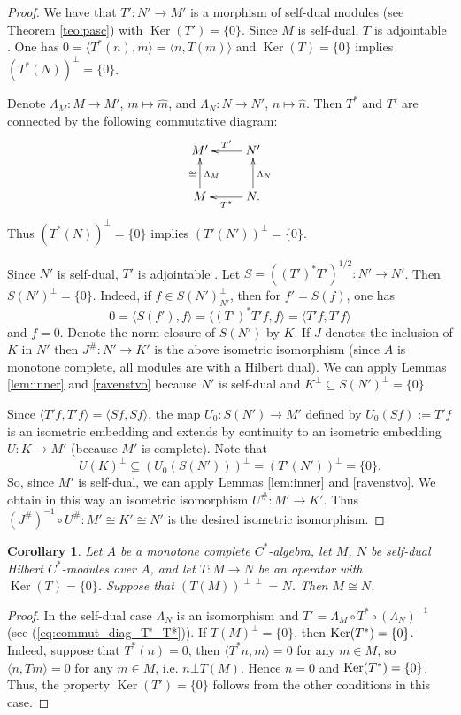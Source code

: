 \documentclass[12pt]{amsart}
\newtheorem{cor}[teo]{Corollary}
\newcommand{\Ker}{\operatorname{Ker}}
\def\<{\langle}
\def\>{\rangle}
\def\Ker{\mathop{\rm Ker}\nolimits}
\begin{document}
\begin{proof}
We have that $T':N'\to M'$ is  a morphism of self-dual modules (see Theorem \ref{teo:pasc})
with $\operatorname{Ker}(T')=\{0\}$. 
Since $M$ is self-dual, $T$ is adjointable \cite{Pas1}. 
One has $0=\<T^*(n),m\>=\<n, T(m)\>$ and 
$\operatorname{Ker}(T)=\{0\}$ implies $(T^*(N))^\bot =\{0\}$.

Denote $\Lambda_M: M \to M'$, $m \mapsto \widehat{m}$, and $\Lambda_N: N \to N'$, $n\mapsto \widehat{n}$. Then $T^*$ and $T'$ are connected by the following
commutative diagram:
\begin{equation}\label{eq:commut_diag_T'_T*}
\xymatrix{
M' & \ar[l]_{T'} N'\\
M \ar[u]^\cong_{\Lambda_M}& \ar[l]^{T^*} N \ar[u]_{\Lambda_N}.
}
\end{equation}
Thus $(T^*(N))^\bot =\{0\}$ implies $(T'(N'))^\bot =\{0\}$.

Since $N'$ is self-dual, $T'$ is adjointable \cite{Pas1}.
Let $S=((T')^*T')^{1/2}:N'\to N'$. Then $S(N')^\perp=\{0\}$. 
Indeed, if $f\in S(N')^\perp_{N'}$, then for $f'=S(f)$, one has 
$$
0=\<S(f'),f\>=\<(T')^*T' f,f\>=\<T'f,T'f\>
$$
and $f=0$. 
Denote the norm closure of $S(N')$ by $K$.  If $J$ denotes the inclusion of $K$ in $N'$ then $J^\#:N'\to K'$ is the above isometric isomorphism
(since $A$ is monotone complete, all modules are with a Hilbert dual).
We can apply Lemmas  \ref{lem:inner} and \ref{ravenstvo} 
because $N'$ is self-dual and $K^\bot \subseteq S(N')^\perp=\{0\}$.

Since $\<T'f,T'f\>=\<Sf,Sf\>$,
the map $U_0:S(N')\to M'$ defined by $U_0(Sf):=T'f$ is an isometric embedding and extends by continuity to an isometric embedding $U:K\to M'$ (because $M'$ is complete). 
Note that 
$$
U(K)^\bot \subseteq (U_0(S(N')))^\bot =(T'(N'))^\bot =\{0\}.
$$
So, since  $M'$ is self-dual, we can apply Lemmas 
\ref{lem:inner} and \ref{ravenstvo}. We obtain in this way an isometric isomorphism
$U^\#: M' \to K'$. Thus $(J^\#)^{-1}\circ U^\#: M'\cong K' \cong N'$ is the desired
isometric isomorphism.
\end{proof}	

\begin{cor}\label{teo:corrected}
	Let $A$ be a monotone complete $C^*$-algebra, let $M$, $N$ be self-dual Hilbert $C^*$-modules over $A$, and let $T:M\to N$ be an operator with $\operatorname{Ker}(T)=\{0\}$. 
	Suppose that $(T(M))^{\perp\perp}=N$.
	Then $M\cong N$.
\end{cor}	
	
\begin{proof}
In the self-dual case $\Lambda_N$ is an isomorphism and
$T' = \Lambda_M \circ T^* \circ (\Lambda_N)^{-1}$
(see (\ref{eq:commut_diag_T'_T*})).
If $T(M)^\bot =\{0\}$, then $\Ker(T^*)=\{0\}$. Indeed,
suppose that $T^*(n)=0$, then $\<T^*n,m\>=0$ for any $m\in M$, so 
$\<n,Tm\>=0$ for any $m\in M$, i.e. $n\bot T(M)$. Hence $n=0$ and $\Ker(T^*)=\{0\}$.
Thus, the property $\operatorname{Ker}(T')=\{0\}$ follows from the other conditions in this case.
\end{proof}	
\end{document}
